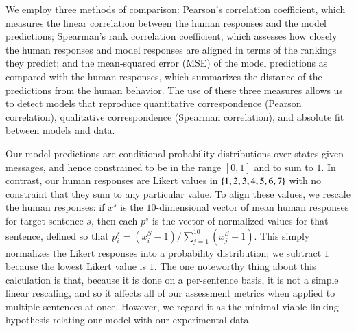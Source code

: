 \documentclass[leqno,12pt]{article}
\begin{document}
We employ three methods of comparison: Pearson's correlation
coefficient, which measures the linear correlation between the human
responses and the model predictions; Spearman's rank correlation
coefficient, which assesses how closely the human responses and model
responses are aligned in terms of the rankings they predict; and the
mean-squared error (MSE) of the model predictions as compared with the
human responses, which summarizes the distance of the predictions from
the human behavior. The use of these three measures allows us to
detect models that reproduce quantitative correspondence (Pearson
correlation), qualitative correspondence (Spearman correlation), and
absolute fit between models and data.

Our model predictions are conditional probability distributions over
states given messages, and hence constrained to be in the range
$[0,1]$ and to sum to $1$. In contrast, our human responses are Likert
values in $\left\{ 1,2,3,4,5,6,7 \right\}$ with no constraint that they sum to
any particular value. To align these values, we rescale the human
responses: if $x^{s}$ is the $10$-dimensional vector of mean human
responses for target sentence $s$, then each $p^{s}$ is the vector of
normalized values for that sentence, defined so that
$p^{s}_{i} = (x^{S}_{i}-1)/\sum_{j=1}^{10}(x^{S}_{j}-1)$. This simply
normalizes the Likert responses into a probability distribution; we
subtract $1$ because the lowest Likert value is $1$. The one
noteworthy thing about this calculation is that, because it is done on
a per-sentence basis, it is not a simple linear rescaling, and so it
affects all of our assessment metrics when applied to multiple
sentences at once. However, we regard it as the minimal viable
linking hypothesis relating our model with our experimental data.
\end{document}
